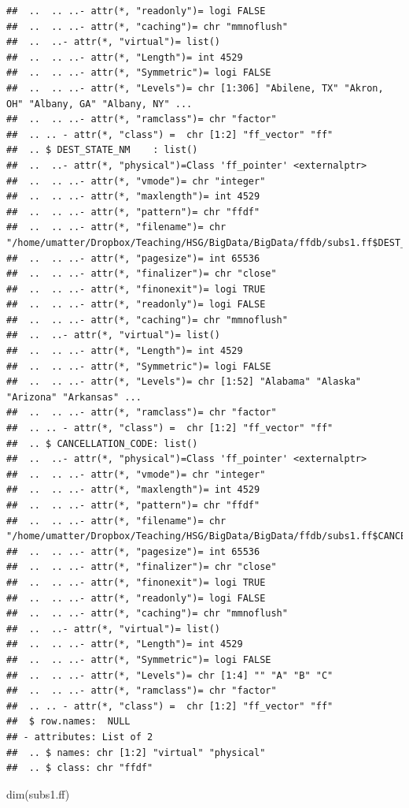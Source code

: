 \documentclass[
  12pt,
]{style/krantz}
\newenvironment{Shaded}{\begin{snugshade}}{\end{snugshade}}
\newcommand{\FunctionTok}[1]{\textcolor[rgb]{0.00,0.00,0.00}{#1}}
\newcommand{\NormalTok}[1]{#1}
\begin{document}
\begin{verbatim}
##  ..  .. ..- attr(*, "readonly")= logi FALSE
##  ..  .. ..- attr(*, "caching")= chr "mmnoflush"
##  ..  ..- attr(*, "virtual")= list()
##  ..  .. ..- attr(*, "Length")= int 4529
##  ..  .. ..- attr(*, "Symmetric")= logi FALSE
##  ..  .. ..- attr(*, "Levels")= chr [1:306] "Abilene, TX" "Akron, OH" "Albany, GA" "Albany, NY" ...
##  ..  .. ..- attr(*, "ramclass")= chr "factor"
##  .. .. - attr(*, "class") =  chr [1:2] "ff_vector" "ff"
##  .. $ DEST_STATE_NM    : list()
##  ..  ..- attr(*, "physical")=Class 'ff_pointer' <externalptr> 
##  ..  .. ..- attr(*, "vmode")= chr "integer"
##  ..  .. ..- attr(*, "maxlength")= int 4529
##  ..  .. ..- attr(*, "pattern")= chr "ffdf"
##  ..  .. ..- attr(*, "filename")= chr "/home/umatter/Dropbox/Teaching/HSG/BigData/BigData/ffdb/subs1.ff$DEST_STATE_NM.ff"
##  ..  .. ..- attr(*, "pagesize")= int 65536
##  ..  .. ..- attr(*, "finalizer")= chr "close"
##  ..  .. ..- attr(*, "finonexit")= logi TRUE
##  ..  .. ..- attr(*, "readonly")= logi FALSE
##  ..  .. ..- attr(*, "caching")= chr "mmnoflush"
##  ..  ..- attr(*, "virtual")= list()
##  ..  .. ..- attr(*, "Length")= int 4529
##  ..  .. ..- attr(*, "Symmetric")= logi FALSE
##  ..  .. ..- attr(*, "Levels")= chr [1:52] "Alabama" "Alaska" "Arizona" "Arkansas" ...
##  ..  .. ..- attr(*, "ramclass")= chr "factor"
##  .. .. - attr(*, "class") =  chr [1:2] "ff_vector" "ff"
##  .. $ CANCELLATION_CODE: list()
##  ..  ..- attr(*, "physical")=Class 'ff_pointer' <externalptr> 
##  ..  .. ..- attr(*, "vmode")= chr "integer"
##  ..  .. ..- attr(*, "maxlength")= int 4529
##  ..  .. ..- attr(*, "pattern")= chr "ffdf"
##  ..  .. ..- attr(*, "filename")= chr "/home/umatter/Dropbox/Teaching/HSG/BigData/BigData/ffdb/subs1.ff$CANCELLATION_CODE.ff"
##  ..  .. ..- attr(*, "pagesize")= int 65536
##  ..  .. ..- attr(*, "finalizer")= chr "close"
##  ..  .. ..- attr(*, "finonexit")= logi TRUE
##  ..  .. ..- attr(*, "readonly")= logi FALSE
##  ..  .. ..- attr(*, "caching")= chr "mmnoflush"
##  ..  ..- attr(*, "virtual")= list()
##  ..  .. ..- attr(*, "Length")= int 4529
##  ..  .. ..- attr(*, "Symmetric")= logi FALSE
##  ..  .. ..- attr(*, "Levels")= chr [1:4] "" "A" "B" "C"
##  ..  .. ..- attr(*, "ramclass")= chr "factor"
##  .. .. - attr(*, "class") =  chr [1:2] "ff_vector" "ff"
##  $ row.names:  NULL
## - attributes: List of 2
##  .. $ names: chr [1:2] "virtual" "physical"
##  .. $ class: chr "ffdf"
\end{verbatim}

\begin{Shaded}
\begin{Highlighting}[]
\FunctionTok{dim}\NormalTok{(subs1.ff)}
\end{Highlighting}
\end{Shaded}
\end{document}

